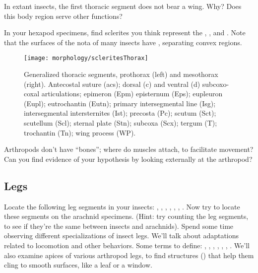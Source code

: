 \begin{theo}
{}In extant insects, the first thoracic segment does not bear a wing. Why? Does this body region serve other functions?
\end{theo}\vspace{3mm}

\noindent{}In your hexapod specimens, find sclerites you think represent the , , and . Note that the surfaces of the nota of many insects have , separating convex regions.\vspace{3mm}

\begin{figure}[ht!]
  \centering
    \texttt{[image: morphology/scleritesThorax]}
  \caption{Generalized thoracic segments, prothorax (left) and mesothorax (right). Antecostal suture (acs); dorsal (c) and ventral (d) subcoxo-coxal articulations; epimeron (Epm) episternum (Eps); eupleuron (Eupl); eutrochantin (Eutn); primary intersegmental line (Isg); intersegmental intersternites (Ist); precosta (Pc); scutum (Sct); scutellum (Scl); sternal plate (Stn); subcoxa (Scx); tergum (T); trochantin (Tn); wing process (WP). \citep[][Fig. 13]{snodgrass1929thoracic}}
  \label{fig:sclerites}
\end{figure}

\begin{theo}
{}Arthropods don't have ``bones''; where do muscles attach, to facilitate movement? Can you find evidence of your hypothesis by looking externally at the arthropod?
\end{theo}\vspace{3mm}

\subsection{Legs}

\noindent{}Locate the following leg segments in your insects: , , , , , , . Now try to locate these segments on the arachnid specimens. (Hint: try counting the leg segments, to see if they're the same between insects and arachnids). Spend some time observing different specializations of insect legs. We'll talk about adaptations related to locomotion and other behaviors. Some terms to define: , , , , , , . We'll also examine apices of various arthropod legs, to find structures () that help them cling to smooth surfaces, like a leaf or a window.\vspace{3mm}

